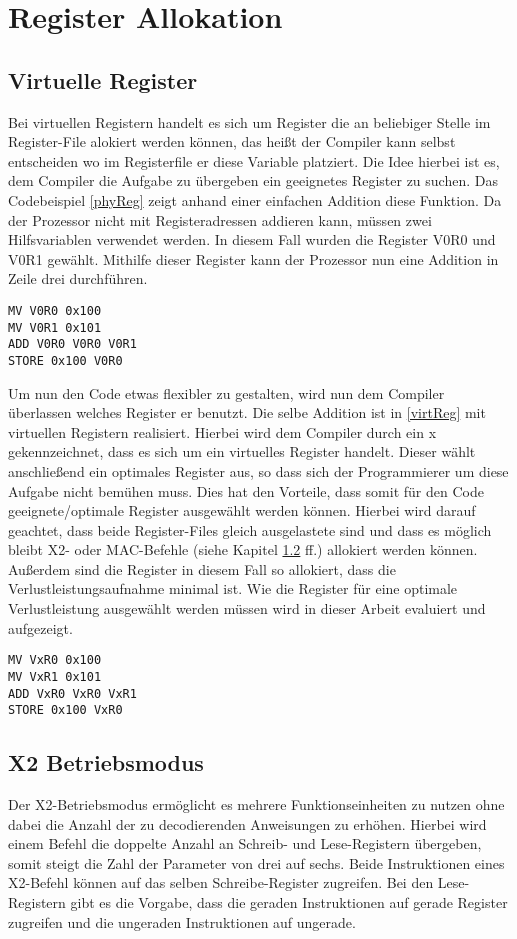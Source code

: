 \section{Register Allokation}
\label{sec:register allok}
\subsection{Virtuelle Register}
Bei virtuellen Registern handelt es sich um Register die an beliebiger Stelle im Register-File alokiert werden können, das heißt der Compiler kann selbst entscheiden wo im Registerfile er diese Variable platziert. 
Die Idee hierbei ist es, dem Compiler die Aufgabe zu übergeben ein geeignetes Register zu suchen. Das Codebeispiel \ref{phyReg} zeigt anhand einer einfachen Addition diese Funktion. Da der Prozessor nicht mit Registeradressen addieren kann, müssen zwei Hilfsvariablen verwendet werden. In diesem Fall wurden die Register V0R0 und V0R1 gewählt. Mithilfe dieser Register kann der Prozessor nun eine Addition in Zeile drei durchführen.
\renewcommand{\lstlistingname}{Codebeispiel}
\begin{lstlisting}[frame=single, caption={physikalische Register},captionpos=b,label=phyReg]
MV V0R0 0x100
MV V0R1 0x101
ADD V0R0 V0R0 V0R1
STORE 0x100 V0R0
\end{lstlisting}
Um nun den Code etwas flexibler zu gestalten, wird  nun dem Compiler überlassen welches Register er benutzt. Die selbe Addition ist in \ref{virtReg} mit virtuellen Registern realisiert. Hierbei wird dem Compiler durch ein  x gekennzeichnet, dass es sich um ein virtuelles Register handelt. Dieser wählt anschließend ein optimales Register aus, so dass sich der Programmierer um diese Aufgabe nicht bemühen muss. Dies hat den Vorteile, dass somit für den Code geeignete/optimale Register ausgewählt werden können. Hierbei wird darauf geachtet, dass beide Register-Files gleich ausgelastete sind und dass es möglich bleibt X2- oder MAC-Befehle (siehe Kapitel \ref{subsec:x2Mode} ff.) allokiert werden können. Außerdem sind die Register in diesem Fall so allokiert, dass die Verlustleistungsaufnahme minimal ist. Wie die Register für eine optimale Verlustleistung ausgewählt werden müssen wird in dieser Arbeit evaluiert und aufgezeigt.

\begin{lstlisting}[frame=single,caption={virtuelle Register},captionpos=b,label=virtReg]
MV VxR0 0x100
MV VxR1 0x101
ADD VxR0 VxR0 VxR1
STORE 0x100 VxR0
\end{lstlisting}
\subsection{X2 Betriebsmodus}\label{subsec:x2Mode}
Der X2-Betriebsmodus ermöglicht es mehrere Funktionseinheiten zu nutzen ohne dabei die Anzahl der zu decodierenden Anweisungen zu erhöhen. Hierbei wird einem Befehl die doppelte Anzahl an Schreib- und Lese-Registern übergeben, somit steigt die Zahl der Parameter von drei auf sechs. Beide Instruktionen eines X2-Befehl können auf das selben Schreibe-Register zugreifen. Bei den Lese-Registern gibt es die Vorgabe, dass die geraden Instruktionen auf gerade Register zugreifen und die ungeraden Instruktionen auf ungerade.%
